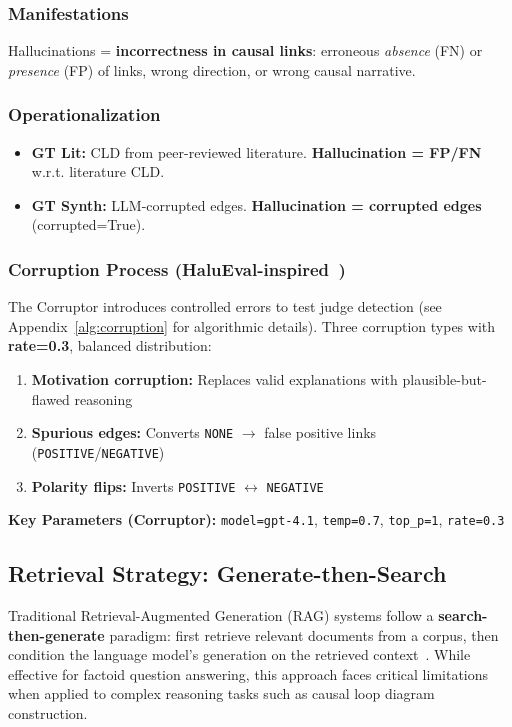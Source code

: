 \subsubsection{Manifestations}
Hallucinations = \textbf{incorrectness in causal links}: erroneous \textit{absence} (FN) or \textit{presence} (FP) of links, wrong direction, or wrong causal narrative.

\subsubsection{Operationalization}
\begin{itemize}[noitemsep]
    \item \textbf{GT Lit:} CLD from peer-reviewed literature. \textbf{Hallucination = FP/FN} w.r.t. literature CLD.
    \item \textbf{GT Synth:} LLM-corrupted edges. \textbf{Hallucination = corrupted edges} (corrupted=True).
\end{itemize}

\subsubsection{Corruption Process (HaluEval-inspired~\cite{li2023halueval})}
The Corruptor introduces controlled errors to test judge detection (see Appendix~\ref{alg:corruption} for algorithmic details). Three corruption types with \textbf{rate=0.3}, balanced distribution:
\begin{enumerate}[noitemsep]
    \item \textbf{Motivation corruption:} Replaces valid explanations with plausible-but-flawed reasoning
    \item \textbf{Spurious edges:} Converts \texttt{NONE} $\rightarrow$ false positive links (\texttt{POSITIVE}/\texttt{NEGATIVE})
    \item \textbf{Polarity flips:} Inverts \texttt{POSITIVE} $\leftrightarrow$ \texttt{NEGATIVE}
\end{enumerate}

\textbf{Key Parameters (Corruptor):} \texttt{model=gpt-4.1}, \texttt{temp=0.7}, \texttt{top\_p=1}, \texttt{rate=0.3}

\subsection{Retrieval Strategy: Generate-then-Search}
\label{sec:retrieval_strategy}

Traditional Retrieval-Augmented Generation (RAG) systems follow a \textbf{search-then-generate} paradigm: first retrieve relevant documents from a corpus, then condition the language model's generation on the retrieved context~\cite{lewis2020rag}. While effective for factoid question answering, this approach faces critical limitations when applied to complex reasoning tasks such as causal loop diagram construction.

